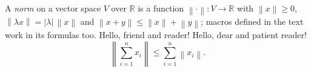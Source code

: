 \newcommand{\R}{\mathbb{R}}
\newcommand{\norm}[1]{\left\lVert #1 \right\rVert}
\newcommand{\term}[1]{\emph{#1}}
\newcommand{\greet}[2][friend]{Hello, #1 and #2!}
A \term{norm} on a vector space $V$ over $\R$ is a function $\norm{\cdot} : V \to \R$ with
$\norm{x} \ge 0$, $\norm{\lambda x} = |\lambda| \, \norm{x}$ and
$\norm{x + y} \le \norm{x} + \norm{y}$; macros defined in the text work in its formulas too.
\greet{reader} \greet[dear]{patient reader}
\[ \norm{\sum_{i=1}^n x_i} \le \sum_{i=1}^n \norm{x_i}. \]
